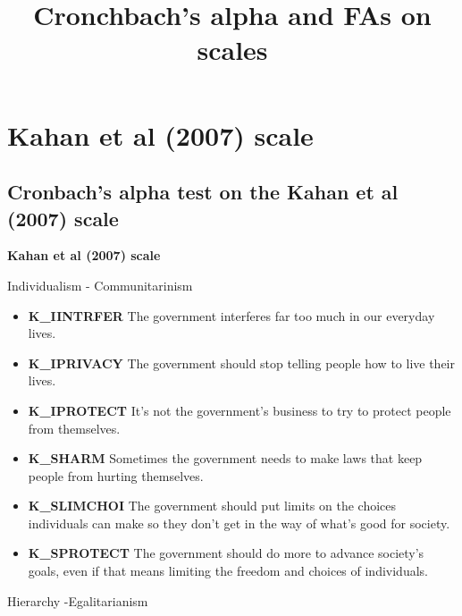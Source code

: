 \documentclass[
]{article}
\title{Cronchbach's alpha and FAs on scales}
\author{}
\date{\vspace{-2.5em}}
\providecommand{\tightlist}{%
  \setlength{\itemsep}{0pt}\setlength{\parskip}{0pt}}
\begin{document}
\maketitle

{
\setcounter{tocdepth}{2}
\tableofcontents
}
\newpage

\hypertarget{kahan-et-al-2007-scale}{%
\section{Kahan et al (2007) scale}\label{kahan-et-al-2007-scale}}

\hypertarget{cronbachs-alpha-test-on-the-kahan-et-al-2007-scale}{%
\subsection{Cronbach's alpha test on the Kahan et al (2007)
scale}\label{cronbachs-alpha-test-on-the-kahan-et-al-2007-scale}}

\textbf{Kahan et al (2007) scale}

Individualism - Communitarinism

\begin{itemize}
\tightlist
\item
  \textbf{K\_IINTRFER} The government interferes far too much in our
  everyday lives.
\item
  \textbf{K\_IPRIVACY} The government should stop telling people how to
  live their lives.
\item
  \textbf{K\_IPROTECT} It's not the government's business to try to
  protect people from themselves.
\item
  \textbf{K\_SHARM} Sometimes the government needs to make laws that
  keep people from hurting themselves.
\item
  \textbf{K\_SLIMCHOI} The government should put limits on the choices
  individuals can make so they don't get in the way of what's good for
  society.
\item
  \textbf{K\_SPROTECT} The government should do more to advance
  society's goals, even if that means limiting the freedom and choices
  of individuals.
\end{itemize}

Hierarchy -Egalitarianism
\end{document}
